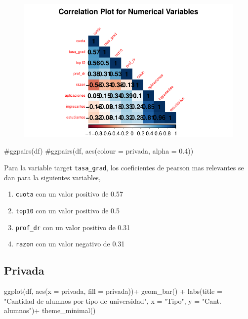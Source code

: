 \documentclass[
  letterpaper,
  DIV=11,
  numbers=noendperiod]{scrartcl}
\newenvironment{Shaded}{\begin{snugshade}}{\end{snugshade}}
\newcommand{\AttributeTok}[1]{\textcolor[rgb]{0.40,0.45,0.13}{#1}}
\newcommand{\CommentTok}[1]{\textcolor[rgb]{0.37,0.37,0.37}{#1}}
\newcommand{\FunctionTok}[1]{\textcolor[rgb]{0.28,0.35,0.67}{#1}}
\newcommand{\NormalTok}[1]{\textcolor[rgb]{0.00,0.23,0.31}{#1}}
\newcommand{\SpecialCharTok}[1]{\textcolor[rgb]{0.37,0.37,0.37}{#1}}
\newcommand{\StringTok}[1]{\textcolor[rgb]{0.13,0.47,0.30}{#1}}
\providecommand{\tightlist}{%
  \setlength{\itemsep}{0pt}\setlength{\parskip}{0pt}}\usepackage{longtable,booktabs,array}
\begin{document}
\begin{figure}[H]

{\centering \includegraphics{TP_final_files/figure-pdf/unnamed-chunk-4-1.pdf}

}

\end{figure}

\begin{Shaded}
\begin{Highlighting}[]
\CommentTok{\#ggpairs(df)}
\CommentTok{\#ggpairs(df, aes(colour = privada, alpha = 0.4))}
\end{Highlighting}
\end{Shaded}

Para la variable target \texttt{tasa\_grad}, los coeficientes de pearson
mas relevantes se dan para la siguientes variables,

\begin{enumerate}
\def\labelenumi{\arabic{enumi}.}
\tightlist
\item
  \texttt{cuota} con un valor positivo de 0.57
\item
  \texttt{top10} con un valor positivo de 0.5
\item
  \texttt{prof\_dr} con un valor positivo de 0.31
\item
  \texttt{razon} con un valor negativo de 0.31
\end{enumerate}

\hypertarget{privada}{%
\subsection{Privada}\label{privada}}

\begin{Shaded}
\begin{Highlighting}[]
\FunctionTok{ggplot}\NormalTok{(df, }\FunctionTok{aes}\NormalTok{(}\AttributeTok{x =}\NormalTok{ privada, }\AttributeTok{fill =}\NormalTok{ privada))}\SpecialCharTok{+}
  \FunctionTok{geom\_bar}\NormalTok{() }\SpecialCharTok{+} 
  \FunctionTok{labs}\NormalTok{(}\AttributeTok{title =} \StringTok{"Cantidad de alumnos por tipo de universidad"}\NormalTok{,}
       \AttributeTok{x =} \StringTok{"Tipo"}\NormalTok{,}
       \AttributeTok{y =} \StringTok{"Cant. alumnos"}\NormalTok{)}\SpecialCharTok{+}
  \FunctionTok{theme\_minimal}\NormalTok{()}
\end{Highlighting}
\end{Shaded}
\end{document}
